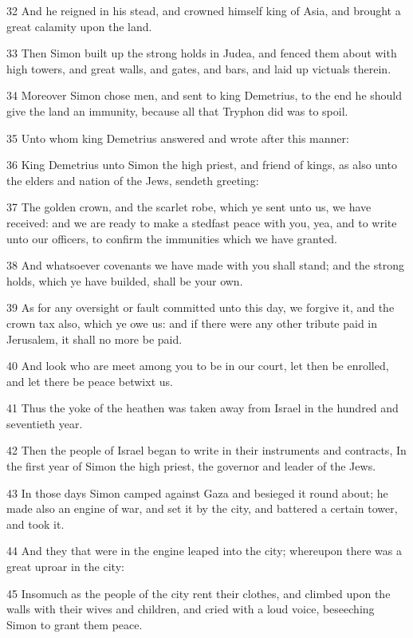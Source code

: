 \par 32 And he reigned in his stead, and crowned himself king of Asia, and brought a great calamity upon the land.
\par 33 Then Simon built up the strong holds in Judea, and fenced them about with high towers, and great walls, and gates, and bars, and laid up victuals therein.
\par 34 Moreover Simon chose men, and sent to king Demetrius, to the end he should give the land an immunity, because all that Tryphon did was to spoil.
\par 35 Unto whom king Demetrius answered and wrote after this manner:
\par 36 King Demetrius unto Simon the high priest, and friend of kings, as also unto the elders and nation of the Jews, sendeth greeting:
\par 37 The golden crown, and the scarlet robe, which ye sent unto us, we have received: and we are ready to make a stedfast peace with you, yea, and to write unto our officers, to confirm the immunities which we have granted.
\par 38 And whatsoever covenants we have made with you shall stand; and the strong holds, which ye have builded, shall be your own.
\par 39 As for any oversight or fault committed unto this day, we forgive it, and the crown tax also, which ye owe us: and if there were any other tribute paid in Jerusalem, it shall no more be paid.
\par 40 And look who are meet among you to be in our court, let then be enrolled, and let there be peace betwixt us.
\par 41 Thus the yoke of the heathen was taken away from Israel in the hundred and seventieth year.
\par 42 Then the people of Israel began to write in their instruments and contracts, In the first year of Simon the high priest, the governor and leader of the Jews.
\par 43 In those days Simon camped against Gaza and besieged it round about; he made also an engine of war, and set it by the city, and battered a certain tower, and took it.
\par 44 And they that were in the engine leaped into the city; whereupon there was a great uproar in the city:
\par 45 Insomuch as the people of the city rent their clothes, and climbed upon the walls with their wives and children, and cried with a loud voice, beseeching Simon to grant them peace.
